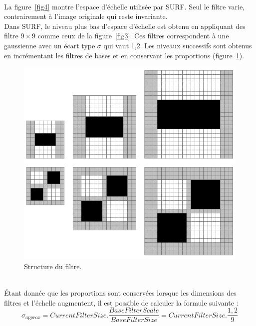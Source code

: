 \documentclass[a4paper,12pt]{report}
\begin{document}
\\La figure~\ref{fig4} montre l'espace d'échelle utilisée par SURF. Seul le filtre varie, contrairement à l'image originale qui reste invariante.
\\ Dans SURF, le niveau plus bas d'espace d'échelle est obtenu en appliquant des filtre $9\times9$ comme ceux de la figure~\ref{fig3}. Ces filtres correspondent à une gaussienne avec un écart type $\sigma$ qui vaut 1,2. Les niveaux successifs sont obtenus en incrémentant les filtres de bases et en conservant les proportions (figure~\ref{fig5}).
\begin{figure}[ht]
\centering
\includegraphics[scale=0.3]{figure5.png}
\caption{Structure du filtre.}
\label{fig5}
\end{figure}
\\\'Etant donnée que les proportions sont conservées lorsque les dimensions des filtres et l'échelle augmentent, il est possible de  calculer la formule suivante :
$$\sigma_{approx}=CurrentFilterSize.\frac{BaseFilterScale}{BaseFilterSize}=CurrentFilterSize.\frac{1,2}{9}$$
\end{document}
